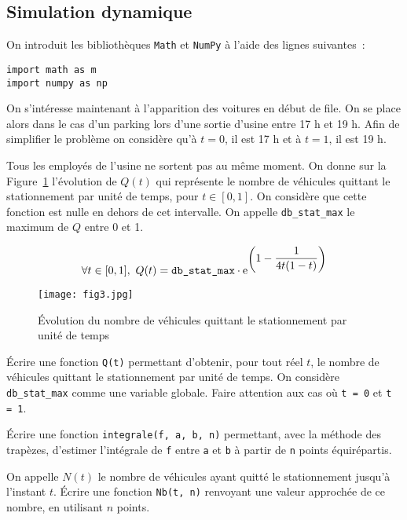 \subsection{Simulation dynamique}
 
On introduit les bibliothèques \texttt{Math} et \texttt{NumPy} à l'aide des lignes suivantes~:
\begin{lstlisting}
import math as m
import numpy as np
\end{lstlisting}


On s'intéresse maintenant à l'apparition des voitures en début de file. On se place alors dans le cas d'un parking lors d'une sortie d'usine entre 17 h et 19 h. Afin de simplifier le problème on considère qu'à $t=0$, il est 17 h et à $t=1$, il est 19 h.

Tous les employés de l'usine ne sortent pas au même moment.  On donne sur la Figure~\ref{f_quitte_stat} l'évolution de $Q(t)$ qui représente le nombre de véhicules quittant le stationnement par unité de temps, pour $t\in[0,1]$. On considère que cette fonction est nulle en dehors de cet intervalle. On appelle \texttt{db\_stat\_max} le maximum de $Q$ entre 0 et 1.

\[ \forall t\in[0,1],\ Q(t)=\mbox{\texttt{db\_stat\_max}}\cdot \mathrm e^{\left(\displaystyle 1-\frac{1}{4t(1-t)}\right)}\]

\begin{figure}[!htb]
\begin{center}
\texttt{[image: fig3.jpg]}
\caption{\label{f_quitte_stat} Évolution du nombre de véhicules quittant le stationnement par unité de temps}
\end{center}
\end{figure}


\question{} \'Ecrire une fonction \texttt{Q(t)} permettant d'obtenir, pour tout réel $t$, le nombre de véhicules quittant le stationnement par unité de temps. On considère \texttt{db\_stat\_max} comme une variable globale. Faire attention aux cas où \texttt{t = 0} et \texttt{t = 1}. 

\question{} \' Ecrire une fonction \texttt{integrale(f, a, b, n)} permettant,  avec la méthode des trapèzes, d'estimer l'intégrale de \texttt{f} entre \texttt{a} et \texttt{b} à partir de \texttt{n} points équirépartis.

\question{} On appelle $N(t)$ le nombre de véhicules ayant quitté le stationnement jusqu'à l'instant $t$. \'Ecrire une fonction \texttt{Nb(t, n)} renvoyant une valeur approchée de ce nombre, en utilisant $n$ points. 
	
